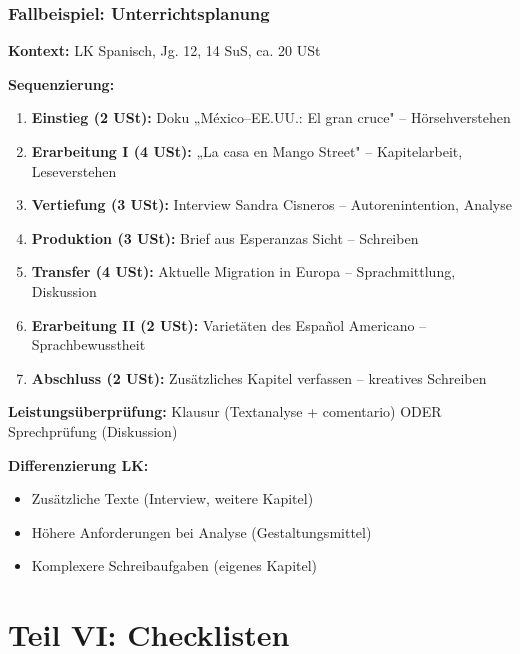 \documentclass[11pt,a4paper]{article}
\begin{document}
\section{Fallbeispiel: Unterrichtsplanung}

\begin{fallbeispielbox}
\textbf{Kontext:} LK Spanisch, Jg. 12, 14 SuS, ca. 20 USt

\textbf{Sequenzierung:}
\begin{enumerate}[leftmargin=0.5cm, itemsep=2pt]
\item \textbf{Einstieg (2 USt):} Doku „México--EE.UU.: El gran cruce" -- Hörsehverstehen
\item \textbf{Erarbeitung I (4 USt):} „La casa en Mango Street" -- Kapitelarbeit, Leseverstehen
\item \textbf{Vertiefung (3 USt):} Interview Sandra Cisneros -- Autorenintention, Analyse
\item \textbf{Produktion (3 USt):} Brief aus Esperanzas Sicht -- Schreiben
\item \textbf{Transfer (4 USt):} Aktuelle Migration in Europa -- Sprachmittlung, Diskussion
\item \textbf{Erarbeitung II (2 USt):} Varietäten des Español Americano -- Sprachbewusstheit
\item \textbf{Abschluss (2 USt):} Zusätzliches Kapitel verfassen -- kreatives Schreiben
\end{enumerate}

\textbf{Leistungsüberprüfung:} Klausur (Textanalyse + comentario) ODER Sprechprüfung (Diskussion)

\textbf{Differenzierung LK:}
\begin{itemize}[leftmargin=0.5cm, itemsep=1pt]
\item Zusätzliche Texte (Interview, weitere Kapitel)
\item Höhere Anforderungen bei Analyse (Gestaltungsmittel)
\item Komplexere Schreibaufgaben (eigenes Kapitel)
\end{itemize}
\end{fallbeispielbox}

\newpage
\part*{Teil VI: Checklisten}
\end{document}
